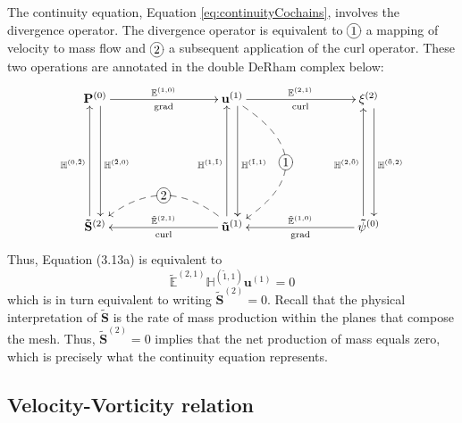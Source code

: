 The continuity equation, Equation \eqref{eq:continuityCochains}, involves the divergence operator. The divergence operator is equivalent to $\xymatrix{*+[o][F-]{1}}$ a mapping of velocity to mass flow and $\xymatrix{*+[o][F-]{2}}$ a subsequent application of the curl operator. These two operations are annotated in the double DeRham complex below: 
\begin{equation}
    \begin{gathered}
        \xymatrix@=20ex{
            \mathbf{P}^{(0)} \ar[r]^{\mathbb{E}^{(1,0)}}_{\text{grad}} \ar@<1ex>[d]^{\mathbb{H}^{(\tilde{2},0)}} & \mathbf{u}^{(1)} \ar[r]^{\mathbb{E}^{(2,1)}}_{\text{curl}} \ar @/^10ex/ @{-->} [d]|-*+[o][F-]{1} \ar@<1ex>[d]^{\mathbb{H}^{(\tilde{1},1)}} & \mathbf{\xi}^{(2)} \ar@<1ex>[d]^{\mathbb{H}^{(\tilde{0},2)}} \\
            \mathbf{\tilde{S}}^{(2)} \ar@<1ex>[u]^{\mathbb{H}^{(0,\tilde{2})}} & \mathbf{\tilde{u}}^{(1)} \ar[l]_{\tilde{\mathbb{E}}^{(2, 1)}}^{\text{curl}} \ar @/_6ex/ @{-->} [l]|-*+[o][F-]{2} \ar@<1ex>[u]^{\mathbb{H}^{(1,\tilde{1})}} & \mathbf{\tilde{\psi}}^{(0)} \ar[l]_{\tilde{\mathbb{E}}^{(1,0)}}^{\text{grad}} \ar@<1ex>[u]^{\mathbb{H}^{(2,\tilde{0})}}
        }
    \end{gathered}
    \label{eq:DeRhamMassConservation}
\end{equation}
Thus, Equation (3.13a) is equivalent to
\begin{equation}
    \tilde{\mathbb{E}}^{(2,1)} \mathbb{H}^{(\tilde{1},1)} \mathbf{u}^{(1)} = 0
\end{equation}
which is in turn equivalent to writing $\mathbf{\tilde{S}}^{(2)} = 0$. Recall that the physical interpretation of $\mathbf{\tilde{S}}$ is the rate of mass production within the planes that compose the mesh. Thus, $\mathbf{\tilde{S}}^{(2)} = 0$ implies that the net production of mass equals zero, which is precisely what the continuity equation represents.

\subsection{Velocity-Vorticity relation}

